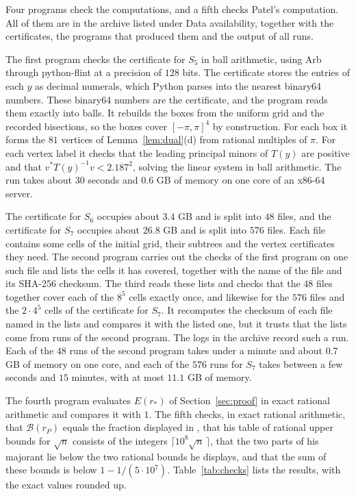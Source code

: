 \documentclass[11pt]{amsart}
\theoremstyle{remark}
\numberwithin{equation}{section}
\newcommand{\Bfun}{\mathcal{B}}
\newcommand{\FiveOwn}{2.187}
\newcommand{\CheckTime}{about $30$ seconds}
\newcommand{\NFilesSeven}{576}
\newcommand{\SizeSeven}{$26.8$}
\newcommand{\TimeSeven}{between a few seconds and $15$ minutes, with at most $11.1$ GB of memory}
\begin{document}
Four programs check the computations, and a fifth checks Patel's computation. All of them are in the archive listed under Data availability, together with the certificates, the programs that produced them and the output of all runs.

The first program checks the certificate for $S_5$ in ball arithmetic, using Arb \cite{Joh17} through python-flint \cite{pyflint} at a precision of $128$ bits. The certificate stores the entries of each $y$ as decimal numerals, which Python parses into the nearest binary64 numbers. These binary64 numbers are the certificate, and the program reads them exactly into balls. It rebuilds the boxes from the uniform grid and the recorded bisections, so the boxes cover $[-\pi,\pi]^4$ by construction. For each box it forms the $81$ vertices of Lemma~\ref{lem:dual}(d) from rational multiples of $\pi$. For each vertex label it checks that the leading principal minors of $T(y)$ are positive and that $v^*T(y)^{-1}v<\FiveOwn^2$, solving the linear system in ball arithmetic. The run takes \CheckTime{} and $0.6$ GB of memory on one core of an x86-64 server.

The certificate for $S_6$ occupies about $3.4$ GB and is split into $48$ files, and the certificate for $S_7$ occupies about \SizeSeven{} GB and is split into $\NFilesSeven$ files. Each file contains some cells of the initial grid, their subtrees and the vertex certificates they need. The second program carries out the checks of the first program on one such file and lists the cells it has covered, together with the name of the file and its SHA-256 checksum. The third reads these lists and checks that the $48$ files together cover each of the $8^5$ cells exactly once, and likewise for the $\NFilesSeven$ files and the $2\cdot4^5$ cells of the certificate for $S_7$. It recomputes the checksum of each file named in the lists and compares it with the listed one, but it trusts that the lists come from runs of the second program. The logs in the archive record such a run. Each of the $48$ runs of the second program takes under a minute and about $0.7$ GB of memory on one core, and each of the $\NFilesSeven$ runs for $S_7$ takes \TimeSeven.

The fourth program evaluates $E(r_*)$ of Section~\ref{sec:proof} in exact rational arithmetic and compares it with $1$. The fifth checks, in exact rational arithmetic, that $\Bfun(r_P)$ equals the fraction displayed in \cite{PatMDB}, that his table of rational upper bounds for $\sqrt n$ consists of the integers $\lceil10^8\sqrt n\,\rceil$, that the two parts of his majorant lie below the two rational bounds he displays, and that the sum of these bounds is below $1-1/(5\cdot10^7)$. Table~\ref{tab:checks} lists the results, with the exact values rounded up.
\end{document}
